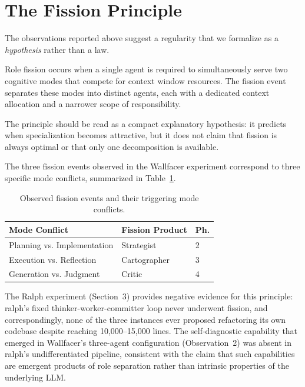 \section{The Fission Principle}

The observations reported above suggest a regularity that we formalize as a \emph{hypothesis} rather than a law.

\begin{principle}
Role fission occurs when a single agent is required to simultaneously serve two cognitive modes that compete for context window resources. The fission event separates these modes into distinct agents, each with a dedicated context allocation and a narrower scope of responsibility.
\end{principle}

The principle should be read as a compact explanatory hypothesis: it predicts when specialization becomes attractive, but it does not claim that fission is always optimal or that only one decomposition is available.

The three fission events observed in the Wallfacer experiment correspond to three specific mode conflicts, summarized in Table~\ref{tab:fission}.

\begin{table}[h]
\small
\caption{Observed fission events and their triggering mode conflicts.}
\label{tab:fission}
\begin{tabular}{@{}lll@{}}
\toprule
\textbf{Mode Conflict} & \textbf{Fission Product} & \textbf{Ph.} \\
\midrule
Planning vs. Implementation & Strategist & 2 \\
Execution vs. Reflection & Cartographer & 3 \\
Generation vs. Judgment & Critic & 4 \\
\bottomrule
\end{tabular}
\end{table}

The Ralph experiment (Section~3) provides negative evidence for this principle: ralph's fixed thinker-worker-committer loop never underwent fission, and correspondingly, none of the three instances ever proposed refactoring its own codebase despite reaching 10{,}000--15{,}000 lines. The self-diagnostic capability that emerged in Wallfacer's three-agent configuration (Observation~2) was absent in ralph's undifferentiated pipeline, consistent with the claim that such capabilities are emergent products of role separation rather than intrinsic properties of the underlying LLM.


